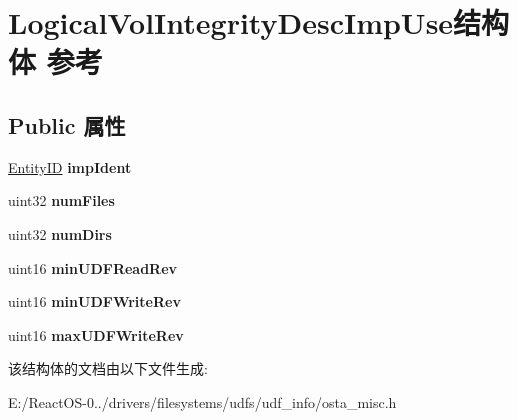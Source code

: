\hypertarget{struct_logical_vol_integrity_desc_imp_use}{}\section{Logical\+Vol\+Integrity\+Desc\+Imp\+Use结构体 参考}
\label{struct_logical_vol_integrity_desc_imp_use}
\subsection*{Public 属性}
\begin{DoxyCompactItemize}
\item 
\mbox{\label{struct_logical_vol_integrity_desc_imp_use_a272f08d9509d03cb00ec0ad60f8a6f56}} 
\hyperlink{struct_entity_i_d}{Entity\+ID} {\bfseries imp\+Ident}
\item 
\mbox{\label{struct_logical_vol_integrity_desc_imp_use_aacab68db15f1d86e6b63a1c3c620737d}} 
uint32 {\bfseries num\+Files}
\item 
\mbox{\label{struct_logical_vol_integrity_desc_imp_use_aab049a86d3332346bf4a38c1b92e2df8}} 
uint32 {\bfseries num\+Dirs}
\item 
\mbox{\label{struct_logical_vol_integrity_desc_imp_use_a59240ebe88b60704ff51029465a68234}} 
uint16 {\bfseries min\+U\+D\+F\+Read\+Rev}
\item 
\mbox{\label{struct_logical_vol_integrity_desc_imp_use_aa7eab75454d6cdd94fc21a08384b96a1}} 
uint16 {\bfseries min\+U\+D\+F\+Write\+Rev}
\item 
\mbox{\label{struct_logical_vol_integrity_desc_imp_use_a96480e3660bc4dd93dda0424522f3489}} 
uint16 {\bfseries max\+U\+D\+F\+Write\+Rev}
\end{DoxyCompactItemize}


该结构体的文档由以下文件生成\+:\begin{DoxyCompactItemize}
\item 
E\+:/\+React\+O\+S-\/0../drivers/filesystems/udfs/udf\+\_\+info/osta\+\_\+misc.\+h\end{DoxyCompactItemize}
